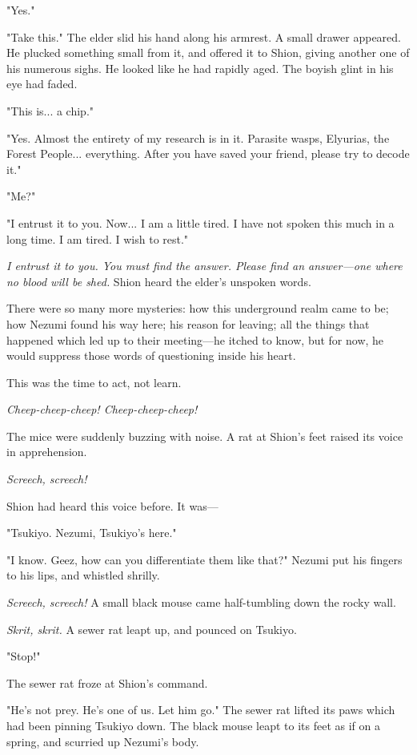 "Yes."

"Take this." The elder slid his hand along his armrest. A small drawer
appeared. He plucked something small from it, and offered it to Shion,
giving another one of his numerous sighs. He looked like he had rapidly
aged. The boyish glint in his eye had faded.

"This is... a chip."

"Yes. Almost the entirety of my research is in it. Parasite wasps,
Elyurias, the Forest People... everything. After you have saved your
friend, please try to decode it."

"Me?"

"I entrust it to you. Now... I am a little tired. I have not spoken this
much in a long time. I am tired. I wish to rest."

\emph{I entrust it to you. You must find the answer. Please find an answer---one
where no blood will be shed.} Shion heard the elder's unspoken words.

There were so many more mysteries: how this underground realm came to
be; how Nezumi found his way here; his reason for leaving; all the
things that happened which led up to their meeting---he itched to know,
but for now, he would suppress those words of questioning inside his
heart.

This was the time to act, not learn.

\emph{Cheep-cheep-cheep! Cheep-cheep-cheep!}

The mice were suddenly buzzing with noise. A rat at Shion's feet raised
its voice in apprehension.

\emph{Screech, screech!}

Shion had heard this voice before. It was---

"Tsukiyo. Nezumi, Tsukiyo's here."

"I know. Geez, how can you differentiate them like that?" Nezumi put his
fingers to his lips, and whistled shrilly.

\emph{Screech, screech!} A small black mouse came half-tumbling down the rocky
wall.

\emph{Skrit, skrit.} A sewer rat leapt up, and pounced on Tsukiyo.

"Stop!"

The sewer rat froze at Shion's command.

"He's not prey. He's one of us. Let him go." The sewer rat lifted its
paws which had been pinning Tsukiyo down. The black mouse leapt to its
feet as if on a spring, and scurried up Nezumi's body.

